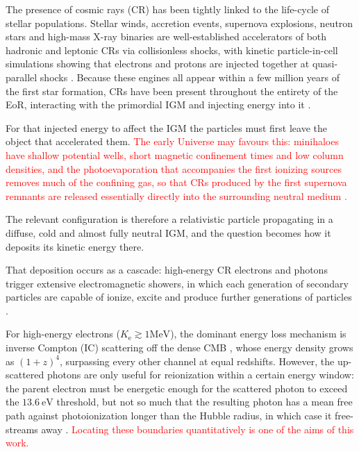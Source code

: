 \documentclass{aa}
\begin{document}
The presence of cosmic rays (CR) has been  tightly linked to the life-cycle of stellar populations. Stellar winds, accretion events, supernova explosions, neutron stars and high-mass X-ray binaries are well-established accelerators of both hadronic and leptonic CRs via collisionless shocks, with
kinetic particle-in-cell simulations showing that electrons and protons are injected together at quasi-parallel shocks
\citep{Aharonian2019,Park2015} \citep{Bykov2017}
\citep{Mirabel2011,Kaur2022}. Because these engines all appear within a few million years of the first star formation, CRs have been present throughout the entirety of the EoR, interacting with the primordial IGM and injecting energy into it \citep{Sazonov2015,Leite2017,Ruszkowski2023}.

For that injected energy to affect the IGM the particles must first leave the object that accelerated them. \textcolor{red}{The early Universe may favours this: minihaloes have shallow potential wells, short magnetic confinement times and low column densities, and the photoevaporation that accompanies the first ionizing sources removes much of the confining gas, so
that CRs produced by the first supernova remnants are released essentially directly into the surrounding neutral medium
\citep{Sazonov2015,Leite2017,Jana2018}.} 

The relevant configuration is therefore a relativistic particle propagating in a diffuse, cold and almost fully neutral IGM, and the question becomes how it deposits its kinetic energy there.

That deposition occurs as a cascade: high-energy CR electrons and photons trigger extensive electromagnetic showers, in which each generation of secondary particles are capable of ionize, excite and produce further generations of particles \citep{Valdes2010,Slatyer2016}. 

For high-energy electrons ($K_{\mathrm{e}} \gtrsim 1 \text{MeV}$), the dominant energy loss mechanism is inverse Compton (IC) scattering off the dense CMB \citep{Blumenthal1970,Gould1972}, whose energy density grows as $(1+z)^{4}$, surpassing every other channel at equal redshifts.  However, the up-scattered photons are only useful for reionization within a certain energy window: the parent electron must be energetic enough for the scattered photon to exceed the $13.6\ \mathrm{eV}$ threshold, but not so much that the resulting photon has a mean free path against photoionization longer than the Hubble radius, in which case it free-streams
away \citep{Zdziarski1989,Slatyer2016}. \textcolor{red}{Locating these boundaries quantitatively is one of the aims of this work.}
\end{document}
